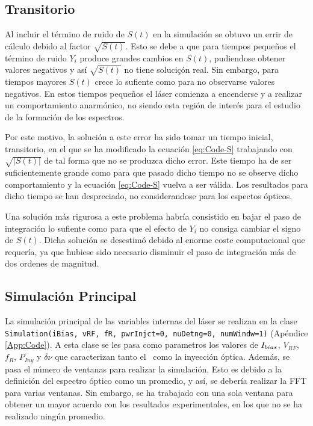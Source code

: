 	\subsection{Transitorio}
		\label{Mdl:Code:Trans}

		Al incluir el t\'ermino de ruido de $S(t)$ en la simulaci\'on se obtuvo un errir de c\'alculo debido al factor $\sqrt{S(t)}$. Esto se debe a que para tiempos pequeños el término de ruido $Y_i$ produce grandes cambios en $S(t)$, pudiendose obtener valores negativos y así $\sqrt{S(t)}$ no tiene soluciçón real. Sin embargo, para tiempos mayores $S(t)$ crece lo sufiente como para no observarse valores negativos. En estos tiempos pequeños el láser comienza a encenderse y a realizar un comportamiento anarmónico, no siendo esta región de interés para el estudio de la formación de los espectros.

		Por este motivo, la solución a este error ha sido tomar un tiempo inicial, transitorio, en el que se ha modificado la ecuación \ref{eq:Code-S} trabajando con $\sqrt{|S(t)|}$ de tal forma que no se produzca dicho error. Este tiempo ha de ser suficientemente grande como para que pasado dicho tiempo no se observe dicho comportamiento y la ecuación \ref{eq:Code-S} vuelva a ser v\'alida. Los resultados para dicho tiempo se han despreciado, no considerandose para los espectos \'opticos.

		Una soluci\'on m\'as rigurosa a este problema habr\'ia consistido en bajar el paso de integraci\'on lo sufiente como para que el efecto de $Y_i$ no consiga cambiar el signo de $S(t)$. Dicha soluci\'on se desestim\'o debido al enorme coste computacional que requer\'ia, ya que hubiese sido necesario disminuir el paso de integraci\'on m\'as de dos ordenes de magnitud.

	\subsection{Simulaci\'on Principal}
		\label{Mdl:Code:main}
		
		La simulaci\'on principal de las variables internas del l\'aser se realizan en la clase \texttt{Simulation(iBias, vRF, fR, pwrInjct=0, nuDetng=0, numWindw=1)} (Ap\'endice \ref{App:Code}). A esta clase se les pasa como parametros los valores de $I_{bias}$, $V_{RF}$, $f_R$, $P_{Iny}$ y $\delta\nu$ que caracterizan tanto el \gs\ como la inyección \'optica. Adem\'as, se pasa el n\'umero de ventanas para realizar la simulaci\'on. Esto es debido a la definici\'on del espectro \'optico como un promedio, y as\'i, se deber\'ia realizar la FFT para varias ventanas. Sin embargo, se ha trabajado con una sola ventana para obtener un mayor acuerdo con los resultados experimentales, en los que no se ha realizado ning\'un promedio.

